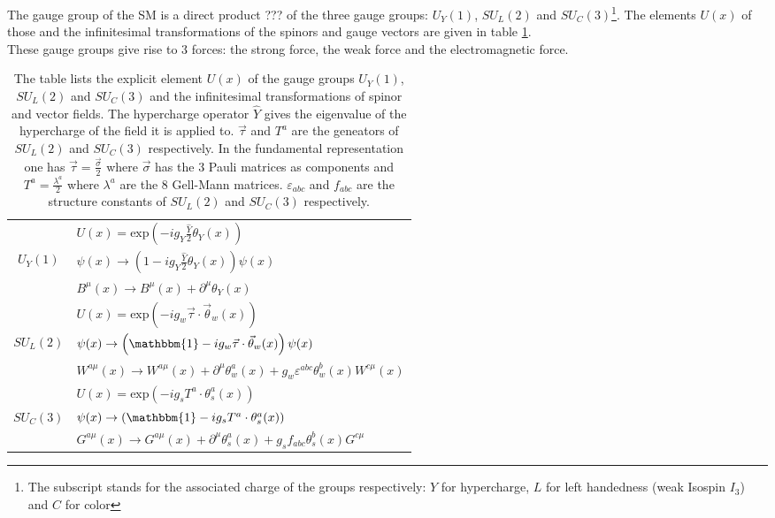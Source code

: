 The gauge group of the SM is a direct product ??? of the three gauge groups: $U_Y(1)$, $SU_L(2)$ and $SU_C(3)$\footnote{The subscript stands for the associated charge of the groups respectively: $Y$ for hypercharge, $L$ for left handedness (weak Isospin $I_3$) and $C$ for color}. The elements $U(x)$ of those and the infinitesimal transformations of the spinors and gauge vectors are given in table \ref{tab:SM_transformations}.\\
These gauge groups give rise to 3 forces: the strong force, the weak force and the electromagnetic force.
\begin{table}[H]
\begin{center}
\begin{tabular}{|c|l|}
\hline
 & $U(x) = \mathrm{exp}\left(-ig_Y\frac{\hat{Y}}{2}\theta_Y(x)\right)$\\
 $U_Y(1)$ & $\psi(x) \to \left( 1 - ig_Y\frac{\hat{Y}}{2}\theta_Y(x)\right)\psi(x)$\\
 & $B^\mu(x) \to B^\mu(x) + \partial^\mu\theta_Y(x)$\\
\hline
 & $U(x) = \mathrm{exp}\left(-ig_w \vec{\tau} \cdot \vec{\theta}_w(x)\right)$\\
 $SU_L(2)$ & $\psi(x) \to \left( \mathbbm{1} - ig_w \vec{\tau} \cdot \vec{\theta}_w(x)\right)\psi(x)$\\
 & $W^{a\mu}(x) \to W^{a\mu}(x) +\partial^\mu\theta^a_w(x) + g_w \varepsilon^{abc} \theta^b_w(x)W^{c\mu}(x)$\\
  \hline
 & $U(x) = \mathrm{exp}\left(-ig_s T^a \cdot \theta_s^a(x)\right)$\\
$SU_C(3)$ & $\psi(x) \to \left(\mathbbm{1}-ig_s T^a \cdot \theta_s^a(x)\right)$\\
 & $G^{a\mu}(x) \to G^{a\mu}(x) + \partial^\mu\theta^a_s(x) + g_s f_{abc} \theta^b_s(x)G^{c\mu}$\\
 \hline
\end{tabular}
\caption{The table lists the explicit element $U(x)$ of the gauge groups $U_Y(1)$, $SU_L(2)$ and $SU_C(3)$ and the infinitesimal transformations of spinor and vector fields.\newline
The hypercharge operator $\hat{Y}$ gives the eigenvalue of the hypercharge of the field it is applied to. $\vec{\tau}$ and $T^a$ are the geneators of $SU_L(2)$ and $SU_C(3)$ respectively. In the fundamental representation one has $\vec{\tau} = \frac{\vec{\sigma}}{2}$ where $\vec{\sigma}$ has the 3 Pauli matrices as components and $T^a = \frac{\lambda^a}{2}$ where $\lambda^a$ are the 8 Gell-Mann matrices. $\varepsilon_{abc}$ and $f_{abc}$ are the structure constants of $SU_L(2)$ and $SU_C(3)$ respectively.}\label{tab:SM_transformations}
\end{center}
\end{table}


